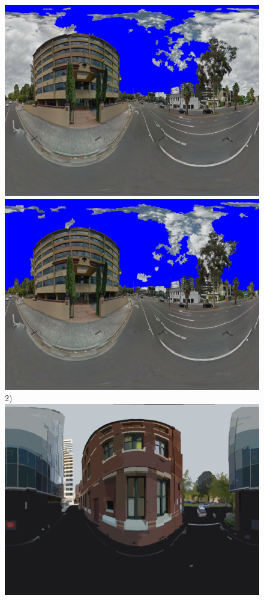 \documentclass[final,3p,times,authoryear]{elsarticle}
\begin{document}
\begin{figure}
\textbf{}\includegraphics[scale=0.08]{Images/mean/4880_5_7_210_ms_sky_mark.png} 
\textbf{}\includegraphics[scale=0.08]{Images/mean/4880_7_8_300_ms_sky_mark.png} 2)
\textbf{}\includegraphics[scale=0.08]{Images/mean/0070_3_6_100.png} 

\end{figure}
\end{document}
